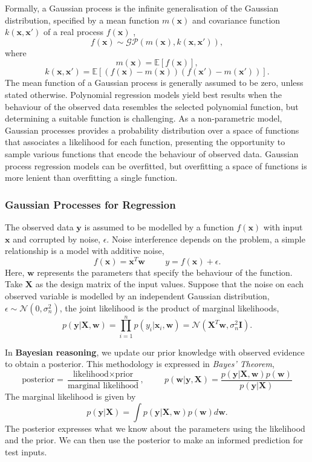 \documentclass[ %
author={Dillon Keith Diep},
supervisor={Dr. Carl Henrik Ek},
degree={MEng},
title={ART-CG Hair:},
subtitle={Assisted Real-time Content Generation of Stylised Virtual Hair},
type={Research},
year={2017} ]{dissertation}
\begin{document}
	Formally, a Gaussian process is the infinite generalisation of the Gaussian distribution, specified by a mean function $m(\bm{x})$ and covariance function $k(\bm{x},\bm{x'})$ of a real process $f(\bm{x})$ \cite[p.13]{gp},
	$$f(\bm{x})\sim\mathcal{GP}(m(\bm{x}), k(\bm{x}, \bm{x'})),$$
	where
	$$m(\bm{x})=\mathbb{E}[f(\bm{x})],$$
	$$k(\bm{x},\bm{x'})=\mathbb{E}[(f(\bm{x})-m(\bm{x}))(f(\bm{x'})-m(\bm{x'}))].$$
	The mean function of a Gaussian process is generally assumed to be zero, unless stated otherwise.
	Polynomial regression models yield best results when the behaviour of the observed data resembles the selected polynomial function, but determining a suitable function is challenging. As a non-parametric model, Gaussian processes provides a probability distribution over a space of functions that associates a likelihood for each function, presenting the opportunity to sample various functions that encode the behaviour of observed data. Gaussian process regression models can be overfitted, but overfitting a space of functions is more lenient than overfitting a single function.
	
	\subsubsection{Gaussian Processes for Regression}
	The observed data $\bm{y}$ is assumed to be modelled by a function $f(\bm{x})$ with input $\bm{x}$ and corrupted by noise, $\epsilon$. Noise interference depends on the problem, a simple relationship is a model with additive noise,
	$$f(\bm{x})=\bm{x}^T\bm{w}
	\hspace{1cm}
	y = f(\bm{x}) + \epsilon.$$
	Here, $\bm{w}$ represents the parameters that specify the behaviour of the function. Take $\bm{X}$ as the design matrix of the input values. Suppose that the noise on each observed variable is modelled by an independent Gaussian distribution, $\epsilon\sim\mathcal{N}(0, \sigma^2_n)$, the joint likelihood is the product of marginal likelihoods,
	$$p(\bm{y}|\bm{X},\bm{w})=\prod^n_{i=1}p(y_i|\bm{x}_i, \bm{w})=\mathcal{N}(\bm{X}^T\bm{w}, \sigma^2_n\bm{I}).$$
	
	In \textbf{Bayesian reasoning}, we update our prior knowledge with observed evidence to obtain a posterior. This methodology is expressed in \textit{Bayes' Theorem},
	$$\text{posterior}=\frac{\text{likelihood}\times\text{prior}}{\text{marginal likelihood}}, \hspace{1cm} p(\bm{w}|\bm{y},\bm{X})=\frac{p(\bm{y}|\bm{X},\bm{w})p(\bm{w})}{p(\bm{y}|\bm{X})}$$
	The marginal likelihood is given by
	$$p(\bm{y}|\bm{X})=\int p(\bm{y}|\bm{X},\bm{w})p(\bm{w})d\bm{w}.$$
	The posterior expresses what we know about the parameters using the likelihood and the prior. We can then use the posterior to make an informed prediction for test inputs.
	
\end{document}
